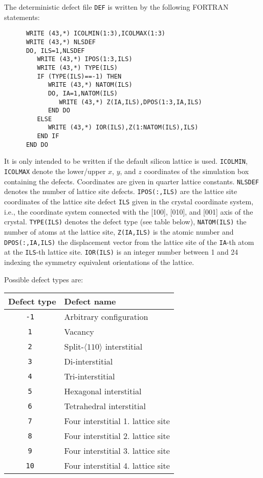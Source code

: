 \ifprivate
The deterministic defect file \texttt{DEF} is written by the following FORTRAN
statements:
%
\begin{verbatim}
      WRITE (43,*) ICOLMIN(1:3),ICOLMAX(1:3)
      WRITE (43,*) NLSDEF
      DO, ILS=1,NLSDEF
         WRITE (43,*) IPOS(1:3,ILS)
         WRITE (43,*) TYPE(ILS)
         IF (TYPE(ILS)==-1) THEN
            WRITE (43,*) NATOM(ILS)
            DO, IA=1,NATOM(ILS)
               WRITE (43,*) Z(IA,ILS),DPOS(1:3,IA,ILS)
            END DO
         ELSE
            WRITE (43,*) IOR(ILS),Z(1:NATOM(ILS),ILS)
         END IF
      END DO
\end{verbatim}
%
It is only intended to be written if the default silicon lattice is used.
\texttt{ICOLMIN}, \texttt{ICOLMAX} denote the lower/upper $x$, $y$, and $z$
coordinates of the simulation box containing the defects. Coordinates
are given in quarter lattice constants. \texttt{NLSDEF} denotes the number of
lattice site defects. \texttt{IPOS(:,ILS)} are the lattice site coordinates of
the lattice site defect \texttt{ILS} given in the crystal coordinate system,
i.e., the coordinate system connected with the [100], [010], and [001] axis of
the crystal. \texttt{TYPE(ILS)} denotes the defect type (see table below),
\texttt{NATOM(ILS)} the number of atoms at the lattice site, \texttt{Z(IA,ILS)}
is the atomic number and \texttt{DPOS(:,IA,ILS)} the displacement vector from
the lattice site of the \texttt{IA}-th atom at the \texttt{ILS}-th lattice site.
\texttt{IOR(ILS)} is an integer number between 1 and 24 indexing the symmetry
equivalent orientations of the lattice.

Possible defect types are:
%
\bigskip
%
\begin{center}
\begin{tabular}{|c|p{}|}
\hline
Defect type & Defect name                               \\
\hline
\tt -1      & Arbitrary configuration                   \\
\tt 1       & Vacancy                                   \\
\tt 2       & Split-$\langle 110 \rangle$ interstitial  \\
\tt 3       & Di-interstitial                           \\
\tt 4       & Tri-interstitial                          \\
\tt 5       & Hexagonal interstitial                    \\
\tt 6       & Tetrahedral interstitial                  \\
\tt 7       & Four interstitial 1. lattice site         \\
\tt 8       & Four interstitial 2. lattice site         \\
\tt 9       & Four interstitial 3. lattice site         \\
\tt 10      & Four interstitial 4. lattice site         \\
\hline
\end{tabular}
\end{center}

